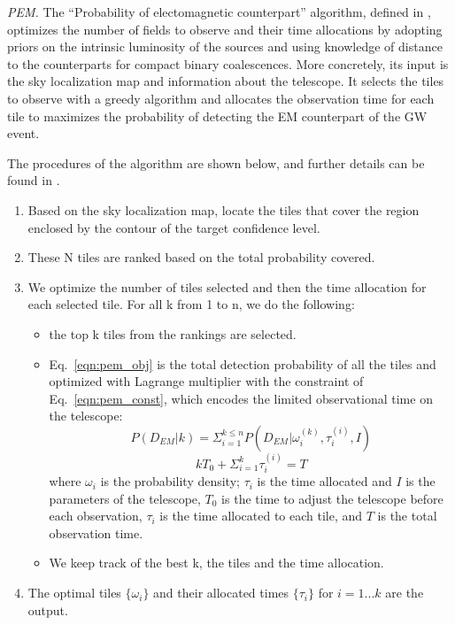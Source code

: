 \documentclass[twocolumn]{aastex62}
\begin{document}
\emph{PEM.} The ``Probability of electomagnetic counterpart'' algorithm, defined in \cite{ChHu2017}, optimizes the number of fields to observe and their time allocations by adopting priors on the intrinsic luminosity of the sources and using knowledge of distance to the counterparts for compact binary coalescences. More concretely, its input is the sky localization map and information about the telescope. It selects the tiles to observe with a greedy algorithm and allocates the observation time for each tile to maximizes the probability of detecting the EM counterpart of the GW event. 

The procedures of the algorithm are shown below, and further details can be found in \cite{ChHu2017}.
\begin{enumerate}
\item Based on the sky localization map, locate the tiles that cover the region enclosed by the contour of the target confidence level.
\item These N tiles are ranked based on the total probability covered.
\item We optimize the number of tiles selected and then the time allocation for each selected tile. For all k from 1 to n, we do the following:
\begin{itemize}
\item the top k tiles from the rankings are selected. 

\item Eq.~\ref{eqn:pem_obj} is the total detection probability of all the tiles and optimized with Lagrange multiplier with the constraint of Eq.~\ref{eqn:pem_const}, which encodes the limited observational time on the telescope: 
\begin{equation}\label{eqn:pem_obj}
P(D_{EM}|k)=\Sigma_{i=1}^{k\leq n}P(D_{EM}|\omega_i^{(k)}, \tau_i^{(i)},I)
\end{equation}
\begin{equation}\label{eqn:pem_const}
kT_0+\Sigma_{i=1}^k\tau_i^{(i)}=T
\end{equation}
where $\omega_i$ is the probability density; $\tau_i$ is the time allocated and $I$ is the parameters of the telescope, $T_0$ is the time to adjust the telescope before each observation, $\tau_i$ is the time allocated to each tile, and $T$ is the total observation time.
\item We keep track of the best k, the tiles and the time allocation.
\end{itemize}

\item The optimal tiles $\{\omega_i\}$ and their allocated times $\{\tau_i\}$ for $i=1...k$ are the output.
\end{enumerate}
\end{document}
